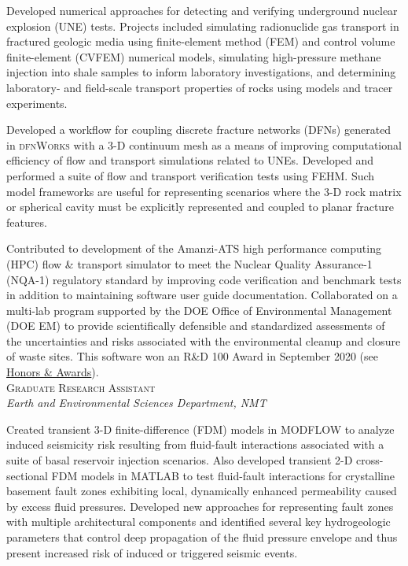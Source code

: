 \documentclass[11pt, letterpaper]{article}
\newcommand{\years}[1]{\marginnote{\scriptsize #1}}
\begin{document}
	Developed numerical approaches for detecting and verifying underground
	nuclear explosion (UNE) tests. Projects included simulating
	radionuclide gas transport in fractured geologic media using finite-element
	method (FEM) and control volume finite-element (CVFEM) numerical models,
	simulating high-pressure methane injection into shale samples to inform
	laboratory investigations, and determining laboratory- and field-scale
	transport properties of rocks using models and tracer experiments.

    Developed a workflow for coupling discrete fracture networks (DFNs)
    generated in \textsc{dfnWorks} with a 3-D continuum mesh as a means of
    improving computational efficiency of flow and transport simulations
    related to UNEs.  Developed and performed a suite of flow and transport
    verification tests using FEHM. Such model frameworks are useful for
    representing scenarios where the 3-D rock matrix or spherical cavity must
    be explicitly represented and coupled to planar fracture features.

    Contributed to development of the Amanzi-ATS high performance computing
    (HPC) flow \& transport simulator to meet the Nuclear Quality Assurance-1
    (NQA-1) regulatory standard by improving code verification and benchmark
    tests in addition to maintaining software user guide documentation.
    Collaborated on a multi-lab program supported by the DOE Office of
    Environmental Management (DOE EM) to provide scientifically defensible and
    standardized assessments of the uncertainties and risks associated with the
    environmental cleanup and closure of waste sites. This software won an R\&D
    100 Award in September 2020 (see \hyperref[sec:awards]{Honors \&
    Awards}).\\

\noindent
\years{2016 - 2017}\textsc{Graduate Research Assistant}\\
\textit{Earth and Environmental Sciences Department, NMT}

    \vspace{3pt} \noindent  
    Created transient 3-D finite-difference (FDM) models in MODFLOW to analyze
    induced seismicity risk resulting from fluid-fault interactions associated
    with a suite of basal reservoir injection scenarios. Also developed
    transient 2-D cross-sectional FDM models in MATLAB to test fluid-fault
    interactions for crystalline basement fault zones exhibiting local,
    dynamically enhanced permeability caused by excess fluid pressures. 
    Developed new approaches for representing fault zones with multiple
    architectural components and identified several key hydrogeologic
    parameters that control deep propagation of the fluid pressure envelope and
    thus present increased risk of induced or triggered seismic events.
\end{document}
